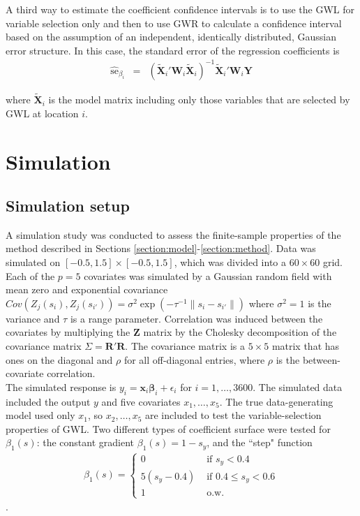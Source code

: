 \documentclass[authoryear, review, 11pt]{elsarticle}
\begin{document}
	 A third way to estimate the coefficient confidence intervals is to use the GWL for variable selection only and then to use GWR to calculate a confidence interval based on the assumption of an independent, identically distributed, Gaussian error structure. In this case, the standard error of the regression coefficients is 
	 \begin{eqnarray}
		\hat{\mbox{se}}_{\beta_i} &=& \left( \tilde{\bm{X}}_i'\bm{W}_i \tilde{\bm{X}}_i \right)^{-1}  \tilde{\bm{X}}_i'\bm{W}_i\bm{Y}
	\end{eqnarray}
	
	where $\tilde{\bm{X}}_i$ is the model matrix including only those variables that are selected by GWL at location $i$.

\section{Simulation}
	\subsection{Simulation setup}
	A simulation study was conducted to assess the finite-sample properties of the method described in Sections \ref{section:model}-\ref{section:method}. Data was simulated on $[-0.5,1.5] \times [-0.5,1.5]$, which was divided into a $60 \times 60$ grid. Each of the $p=5$ covariates was simulated by a Gaussian random field with mean zero and exponential covariance $Cov \left(Z_j(s_i), Z_j(s_{i'}) \right) = \sigma^2 \exp{\left( -\tau^{-1} \|s_i - s_{i'} \| \right)}$ where $\sigma^2=1$ is the variance and $\tau$ is a range parameter. Correlation was induced between the covariates by multiplying the $\bm{Z}$ matrix by the Cholesky decomposition of the covariance matrix $\Sigma = \bm{R}'\bm{R}$. The covariance matrix is a $5 \times 5$ matrix that has ones on the diagonal and $\rho$ for all off-diagonal entries, where $\rho$ is the between-covariate correlation.\\
		
	The simulated response is $y_i = \bm{x}_i \bm{\beta}_i + \epsilon_i$ for $i=1, \dots, 3600$. The simulated data included the output $y$ and five covariates $x_1, \dots, x_5$. The true data-generating model used only $x_1$, so $x_2, \dots, x_5$ are included to test the variable-selection properties of GWL. Two different types of coefficient surface were tested for $\beta_1(s)$: the constant gradient $\beta_1(s) = 1-s_y$, and the ``step" function
	\begin{eqnarray}
		\beta_1(s) = \begin{cases} 0 &\mbox{ if } s_y<0.4 \\ 5(s_y-0.4) &\mbox{ if } 0.4 \leq s_y<0.6 \\ 1 &\mbox{ o.w.} \end{cases}
	\end{eqnarray}.\\
		
\end{document}
